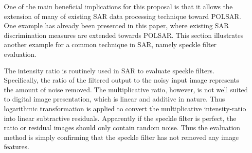 \documentclass[journal]{IEEEtran}
\begin{document}

One of the main beneficial implications for this proposal is that
  it allows the extension of many of existing SAR data processing technique toward POLSAR.
One example has already been presented in this paper,
  where existing SAR discrimination measures are extended towards POLSAR.
This section illustrates another example for a common technique in SAR, namely speckle filter evaluation. 


The intensity ratio is routinely used in SAR to evaluate speckle filters.
Specifically, the ratio of the filtered output to the noisy input image represents the amount of noise removed.
The multiplicative ratio, however, is not well suited to digital image presentation, which is linear and additive in nature\cite{Medeiros_2003_IJRS}. 
Thus logarithmic transformation is applied to convert the multiplicative intensity-ratio into linear subtractive residuals.  
Apparently if the speckle filter is perfect, the ratio or residual images should only contain random noise.
Thus the evaluation method is simply confirming that the speckle filter has not removed any image features.
\end{document}
